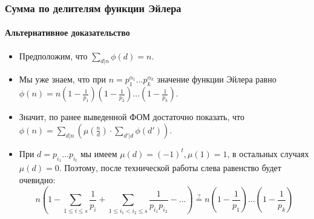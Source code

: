 \begin{frame}[t]
    \small
    \frametitle{\bf \normalsize Сумма по делителям функции Эйлера}
    \framesubtitle{Альтернативное доказательство}

    \begin{itemize}
        \item Предположим, что $\sum\limits_{d | n} \phi(d) = n$. 
        \item Мы уже знаем, что при $n = p_1^{\alpha_1} \dots p_k^{\alpha_k}$ значение функции Эйлера равно $\phi(n) = n\left( 1 - \frac{1}{p_1} \right) \left( 1 - \frac{1}{p_2} \right) \dots \left( 1 - \frac{1}{p_k} \right)$. 
        \item Значит, по ранее выведенной ФОМ достаточно показать, что $\phi(n) = \sum\limits_{d | n} \left( \mu \left( \frac{n}{d} \right) \cdot \sum\limits_{d' | d} \phi(d') \right) $.
        \item При $d = p_{i_1} \dots p_{i_t}$ мы имеем $\mu(d) = (-1)^t, \mu(1) = 1$, в остальных случаях  $\mu(d) = 0$. Поэтому, после технической работы слева равенство будет очевидно: \[
               n\left(1 - \sum_{1 \leq i \leq s} \frac{1}{p_i} + \sum_{1 \leq i_1 < i_2 \leq s}^{} \frac{1}{p_{i_1}p_{i_2}} - \dots \right)\overset{?} = 
 n\left( 1 - \frac{1}{p_1} \right) \dots \left( 1 - \frac{1}{p_k} \right)         \] 
    \end{itemize}
    
    \hfill \qedsymbol
\end{frame}


